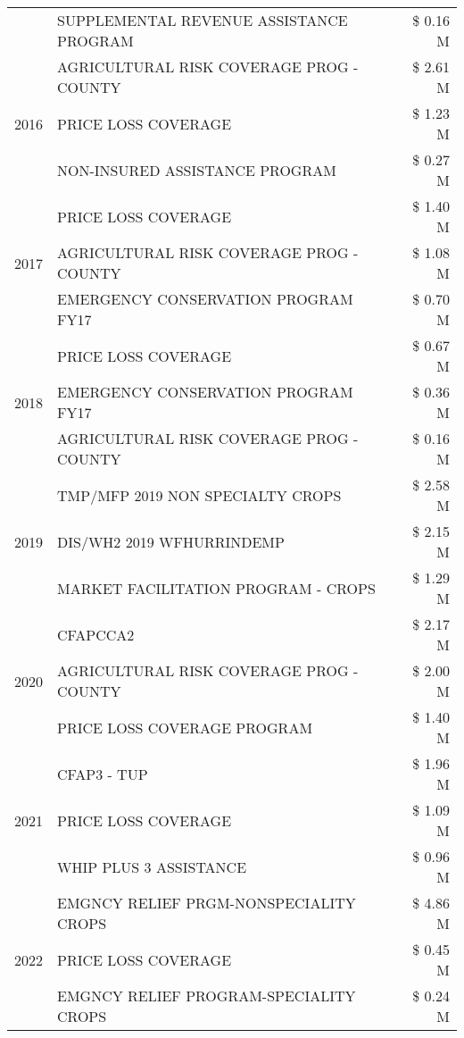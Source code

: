 \begin{tabular}{llr}
 & SUPPLEMENTAL REVENUE ASSISTANCE PROGRAM & \$ 0.16 M \\
\cline{1-3}
\multirow[t]{3}{*}{2016} & AGRICULTURAL RISK COVERAGE PROG - COUNTY & \$ 2.61 M \\
 & PRICE LOSS COVERAGE & \$ 1.23 M \\
 & NON-INSURED ASSISTANCE PROGRAM & \$ 0.27 M \\
\cline{1-3}
\multirow[t]{3}{*}{2017} & PRICE LOSS COVERAGE & \$ 1.40 M \\
 & AGRICULTURAL RISK COVERAGE PROG - COUNTY & \$ 1.08 M \\
 & EMERGENCY CONSERVATION PROGRAM FY17 & \$ 0.70 M \\
\cline{1-3}
\multirow[t]{3}{*}{2018} & PRICE LOSS COVERAGE & \$ 0.67 M \\
 & EMERGENCY CONSERVATION PROGRAM FY17 & \$ 0.36 M \\
 & AGRICULTURAL RISK COVERAGE PROG - COUNTY & \$ 0.16 M \\
\cline{1-3}
\multirow[t]{3}{*}{2019} & TMP/MFP 2019 NON SPECIALTY CROPS & \$ 2.58 M \\
 & DIS/WH2 2019 WFHURRINDEMP & \$ 2.15 M \\
 & MARKET FACILITATION PROGRAM - CROPS & \$ 1.29 M \\
\cline{1-3}
\multirow[t]{3}{*}{2020} & CFAPCCA2 & \$ 2.17 M \\
 & AGRICULTURAL RISK COVERAGE PROG - COUNTY & \$ 2.00 M \\
 & PRICE LOSS COVERAGE PROGRAM & \$ 1.40 M \\
\cline{1-3}
\multirow[t]{3}{*}{2021} & CFAP3 - TUP & \$ 1.96 M \\
 & PRICE LOSS COVERAGE & \$ 1.09 M \\
 & WHIP PLUS 3 ASSISTANCE & \$ 0.96 M \\
\cline{1-3}
\multirow[t]{3}{*}{2022} & EMGNCY RELIEF PRGM-NONSPECIALITY CROPS & \$ 4.86 M \\
 & PRICE LOSS COVERAGE & \$ 0.45 M \\
 & EMGNCY RELIEF PROGRAM-SPECIALITY CROPS & \$ 0.24 M \\
\cline{1-3}
\bottomrule
\end{tabular}
